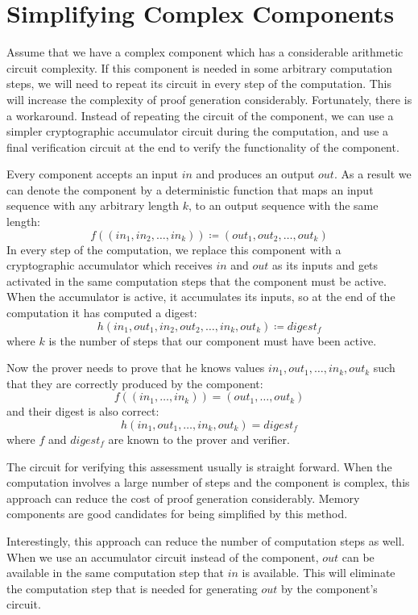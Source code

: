 \pagebreak


\section{Simplifying Complex Components}\label{sec:simplifying-complex-components}

Assume that we have a complex component which has a considerable arithmetic circuit complexity. If this component
is needed in some arbitrary computation steps, we will need to repeat its circuit in every step of the computation. This
will increase the complexity of proof generation considerably. Fortunately, there is a workaround. Instead of
repeating the circuit of the component, we can use a simpler cryptographic accumulator circuit during the
computation, and use a final verification circuit at the end to verify the functionality of the component.

Every component accepts an input $in$ and produces an output $out$. As a result we can denote the component by a
deterministic function that maps an input sequence with any arbitrary length $k$, to an output sequence with the same
length:
\[
    f((in_1,in_2,\dots,in_k)) \coloneqq (out_1,out_2,\dots,out_k)
\]
In every step of the computation, we replace this component with a cryptographic accumulator which receives $in$ and
$out$ as its inputs and gets activated in the same computation steps that the component must be active. When the
accumulator is active, it accumulates its inputs, so at the end of the computation it has computed a digest:
\[
    h(in_1,out_1,in_2,out_2,\dots,in_k,out_k) \coloneqq digest_f
\]
where $k$ is the number of steps that our component must have been active.

Now the prover needs to prove that he knows values $in_1,out_1,\dots,in_k,out_k$ such that they are correctly
produced by the component:
\[
    f((in_1,\dots,in_k)) = (out_1,\dots,out_k)
\]
and their digest is also correct:
\[
    h(in_1,out_1,\dots,in_k,out_k) = digest_f
\]
where $f$ and $digest_f$ are known to the prover and verifier.

The circuit for verifying this assessment usually is straight forward. When the computation involves a large
number of steps and the component is complex, this approach can reduce the cost of proof generation considerably. Memory
components are good candidates for being simplified by this method.

Interestingly, this approach can reduce the number of computation steps as well. When we use an accumulator circuit
instead of the component, $out$ can be available in the same computation step that $in$ is available. This will
eliminate the computation step that is needed for generating $out$ by the component's circuit.

%
